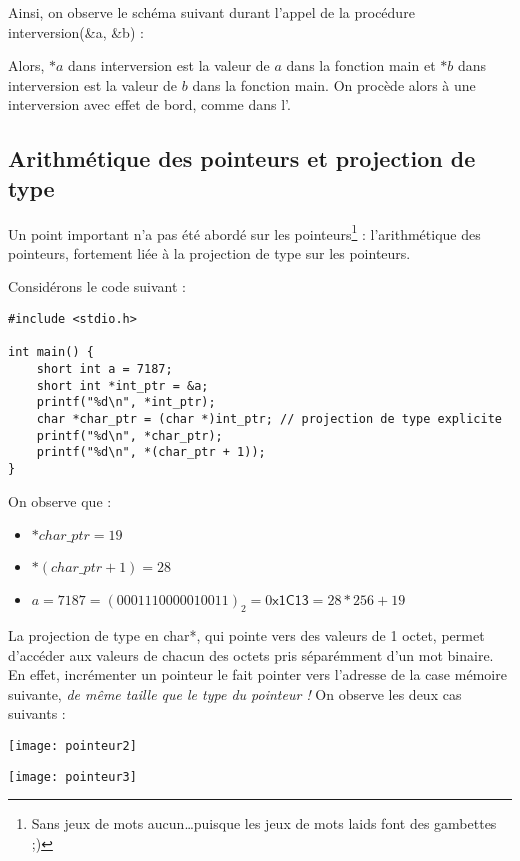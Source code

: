 \documentclass[../../../main.tex]{subfiles}
\begin{document}
Ainsi, on observe le schéma suivant durant l'appel de la procédure \textsf{interversion(\&a, \&b)} :  

\begin{minipage}{\textwidth}
	\begin{center}
		
	\end{center}
\end{minipage}
 
Alors, $*a$ dans \textsf{interversion} est la valeur de $a$ dans la fonction \textsf{main} et $*b$ dans \textsf{interversion} est la valeur de $b$ dans la fonction \textsf{main}. On procède alors à une interversion avec effet de bord, comme dans l'.
 
\subsection{Arithmétique des pointeurs et projection de type}
\label{sub:arithm_tique_des_pointeurs_et_projection_de_type}
Un point important n'a pas été abordé sur les pointeurs\footnote{Sans jeux de mots aucun\dots puisque les jeux de mots laids font des gambettes ;)} : l'arithmétique des pointeurs, fortement liée à la projection de type sur les pointeurs.
 
Considérons le code suivant :
\begin{verbatim}
#include <stdio.h>

int main() {
	short int a = 7187;
	short int *int_ptr = &a;
	printf("%d\n", *int_ptr);
	char *char_ptr = (char *)int_ptr; // projection de type explicite
	printf("%d\n", *char_ptr);
	printf("%d\n", *(char_ptr + 1));
}
\end{verbatim}
On observe que :
\begin{itemize}
	\item $*char\_ptr = 19$
	\item $*(char\_ptr + 1) = 28$
	\item $a = 7187 = (0001110000010011)_{2} = 0\textsf{x1C13} = 28 * 256 + 19$
\end{itemize}
La projection de type en \textsf{char*}, qui pointe vers des valeurs de 1 octet, permet d'accéder aux valeurs de chacun des octets pris séparémment d'un mot binaire. En effet, incrémenter un pointeur le fait pointer vers l'adresse de la case mémoire suivante, \textit{de même taille que le type du pointeur !} On observe les deux cas suivants : 

\begin{minipage}{0.5\textwidth}
\begin{center}
		\texttt{[image: pointeur2]}
	\end{center}
\end{minipage}
\begin{minipage}{0.5\textwidth}
\begin{center}
		\texttt{[image: pointeur3]}
	\end{center}
\end{minipage}
 
\end{document}
